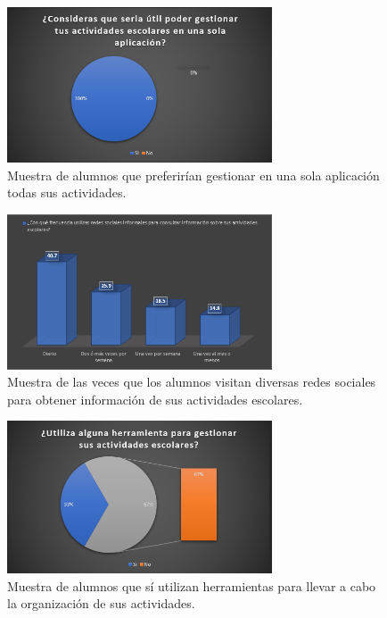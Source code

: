 \documentclass[10pt]{article}
\begin{document}
\par\vspace{\baselineskip}
\begin{figure}[H]
    \begin{center}
    \includegraphics[width=0.7\textwidth]{Imagenes/4.PNG}
    \caption{Muestra de alumnos que preferirían gestionar en una sola aplicación todas sus actividades.}
\label{fig1}
    \end{center}
\end{figure} 
\par\vspace{\baselineskip}
\begin{figure}[H]
    \begin{center}
    \includegraphics[width=0.7\textwidth]{Imagenes/5.PNG}
    \caption{Muestra de las veces que los alumnos visitan diversas redes sociales para obtener información de sus actividades escolares.}
\label{fig1}
    \end{center}
\end{figure} 
\par\vspace{\baselineskip}
\begin{figure}[H]
    \begin{center}
    \includegraphics[width=0.7\textwidth]{Imagenes/6.PNG}
    \caption{Muestra de alumnos que sí utilizan herramientas para llevar a cabo la organización de sus actividades.}
\label{fig1}
    \end{center}
\end{figure} 
\end{document}
